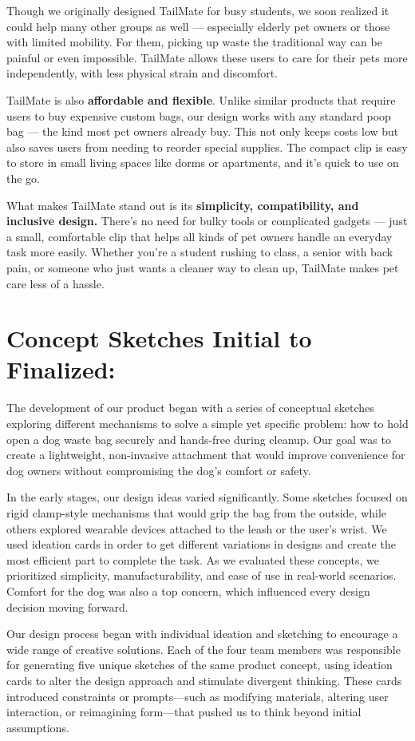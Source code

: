 \documentclass[12pt]{article}
\theoremstyle{definition} %
\theoremstyle{plain} %
\begin{document}
Though we originally designed TailMate for busy students, we soon realized it could
help many other groups as well — especially elderly pet owners or those with limited
mobility. For them, picking up waste the traditional way can be painful or even
impossible. TailMate allows these users to care for their pets more independently,
with less physical strain and discomfort.

TailMate is also \textbf{affordable and flexible}. Unlike similar products that require users to
buy expensive custom bags, our design works with any standard poop bag — the
kind most pet owners already buy. This not only keeps costs low but also saves
users from needing to reorder special supplies. The compact clip is easy to store in
small living spaces like dorms or apartments, and it's quick to use on the go.

What makes TailMate stand out is its \textbf{simplicity, compatibility, and inclusive
design.} There’s no need for bulky tools or complicated gadgets — just a small,
comfortable clip that helps all kinds of pet owners handle an everyday task more
easily. Whether you're a student rushing to class, a senior with back pain, or
someone who just wants a cleaner way to clean up, TailMate makes pet care less of
a hassle.
\pagebreak

\section{Concept Sketches Initial to Finalized:}
The development of our product began with a series of conceptual sketches
exploring different mechanisms to solve a simple yet specific problem: how to hold
open a dog waste bag securely and hands-free during cleanup. Our goal was to
create a lightweight, non-invasive attachment that would improve convenience for
dog owners without compromising the dog’s comfort or safety.

In the early stages, our design ideas varied significantly. Some sketches
focused on rigid clamp-style mechanisms that would grip the bag from the outside,
while others explored wearable devices attached to the leash or the user’s wrist. We
used ideation cards in order to get different variations in designs and create the most
efficient part to complete the task. As we evaluated these concepts, we prioritized
simplicity, manufacturability, and ease of use in real-world scenarios. 
Comfort for the dog was also a top concern, which influenced every design decision moving forward.

Our design process began with individual ideation and sketching to encourage
a wide range of creative solutions. Each of the four team members was responsible
for generating five unique sketches of the same product concept, using ideation
cards to alter the design approach and stimulate divergent thinking. These cards
introduced constraints or prompts—such as modifying materials, altering user
interaction, or reimagining form—that pushed us to think beyond initial assumptions.
\end{document}
